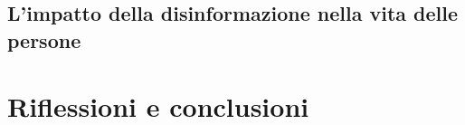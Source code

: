 \documentclass{article}
\begin{document}
\centering\subsection{L'impatto della disinformazione nella vita delle persone}
\begin{justify}
    
\end{justify}
\centering
\newpage\section{Riflessioni e conclusioni}

\newpage

\end{document}
